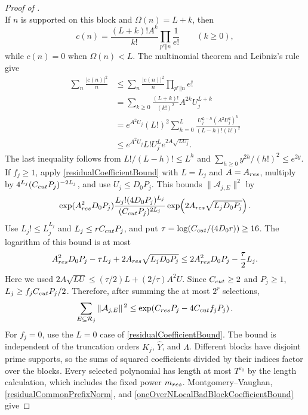 \documentclass[10pt,a4paper]{amsart}
\begin{document}
\begin{proof}[Proof of ]
\[			\]
			If $n$ is supported on this block and $\Omega(n)=L+k$, then
			\[
			c(n)=\frac{(L+k)!A^k}{k!}
			\prod_{p^e\Vert n}\frac1{e!}\qquad(k\geq0),
			\]
			while $c(n)=0$ when $\Omega(n)<L$. The multinomial theorem and
			Leibniz's rule give
			\begin{align}
				\sum_n\frac{|c(n)|^2}{n}
				&\leq\sum_n\frac{|c(n)|^2}{n}\prod_{p^e\Vert n}e!
				\nonumber\\
				&=\sum_{k\geq0}\frac{(L+k)!}{(k!)^2}
				A^{2k}U_j^{L+k}\nonumber\\
				&=e^{A^2U_j}(L!)^2
				\sum_{h=0}^L
				\frac{U_j^{L-h}(A^2U_j^2)^h}{(L-h)!(h!)^2}
				\nonumber\\
				&\leq e^{A^2U_j}L!U_j^L e^{2A\sqrt{LU_j}}.
				\label{residualCoefficientBound}
			\end{align}
			The last inequality follows from $L!/(L-h)!\leq L^h$ and
			$\sum_{h\geq0}y^{2h}/(h!)^2\leq e^{2y}$.
			If $f_j\geq1$, apply \eqref{residualCoefficientBound} with $L=L_j$ and
			$A=A_{\rm res}$, multiply by $4^{L_j}(C_{\rm cut}P_j)^{-2L_j}$,
			and use $U_j\leq D_0P_j$. This bounds $\|\mathcal A_{j,E}\|^2$ by
			\[
			\exp(A_{\rm res}^2D_0P_j)
			\frac{L_j!(4D_0P_j)^{L_j}}
			{(C_{\rm cut}P_j)^{2L_j}}
			\exp\!\left(2A_{\rm res}\sqrt{L_jD_0P_j}\right).
			\]
			Use $L_j!\leq L_j^{L_j}$ and
			$L_j\leq rC_{\rm cut}P_j$, and put
			$\tau=\log(C_{\rm cut}/(4D_0r))\geq16$.
			The logarithm of this bound is at most
			\[
			A_{\rm res}^2D_0P_j-\tau L_j
			+2A_{\rm res}\sqrt{L_jD_0P_j}
			\leq 2A_{\rm res}^2D_0P_j-\frac{\tau}{2}L_j.
			\]
			Here we used
			$2A\sqrt{LU}\leq(\tau/2)L+(2/\tau)A^2U$.
			Since $C_{\rm cut}\geq2$ and $P_j\geq1$,
			$L_j\geq f_jC_{\rm cut}P_j/2$.  Therefore, after summing the
			at most $2^r$ selections,
			\begin{equation}\label{oneOverNLocalBadBlockCoefficientBound}
				\sum_{E\subseteq\mathcal R_j}
				\|\mathcal A_{j,E}\|^{\,2}
				\leq
				\exp\!\left(C_{\rm res}P_j
				-4C_{\rm cut}f_jP_j\right).
			\end{equation}
			For $f_j=0$, use the $L=0$ case of
			\eqref{residualCoefficientBound}.  The bound is independent of
			the truncation orders $K_j$, $\widehat Y$, and $\Lambda$.
			Different blocks have disjoint prime supports, so the sums of squared
			coefficients divided by their indices factor over the blocks.  Every selected polynomial has length
			at most $T^{\varepsilon_0}$ by the length calculation, which
			includes the fixed power $m_{\rm res}$.  Montgomery--Vaughan,
			\eqref{residualCommonPrefixNorm}, and
			\eqref{oneOverNLocalBadBlockCoefficientBound} give

\end{proof}
\end{document}
